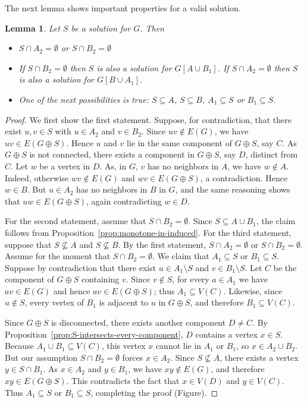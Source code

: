 \documentclass[11pt]{article}
\newtheorem{lemma}[theorem]{Lemma}
\theoremstyle{definition}
\begin{document}
The next lemma shows important properties for a valid solution.

\begin{lemma}\label{lemma:Sdisconnected-characterization}
Let $S$ be a solution for $G$.
Then
\begin{itemize}
    \item $S \cap A_2 = \emptyset$ or $S \cap B_2 = \emptyset$
    \item If $S \cap B_2 = \emptyset$ then $S$ is also a solution for $G[A\cup B_1]$. If $S \cap A_2  = \emptyset$ then $S$ is also a solution for $G[B\cup A_1]$.
  \item One of the next possibilities is true: $S \subseteq A$, $S \subseteq B$,
$A_1 \subseteq S $ or $B_1 \subseteq S$.
\end{itemize}
\end{lemma}
\begin{proof}
We first show the first statement.
 Suppose, for contradiction, that there exist $u,v\in S$ with 
$u\in A_2$ and $v\in B_2$.
Since $uv\notin E(G)$, we have $uv\in E(G \oplus S)$.
Hence $u$ and $v$ lie in the same component of $G\oplus S$, say $C$.
    As $G \oplus S$ is not connected, there exists a component in $G \oplus S$, say $D$, distinct from $C$.
    Let $w$ be a vertex in $D$.
    As, in $G$, $v$ has no neighbors in $A$, we have $w \notin A$. Indeed, otherwise $wv \notin E(G)$ and $wv  \in E(G \oplus S)$, a contradiction.
    Hence $w \in B$. But $u\in A_2$ has no neighbors in $B$ in $G$, and the same reasoning 
shows that $uw\in E(G\oplus S)$, again contradicting $w\in D$.


For the second statement, assume that $S \cap B_2 = \emptyset$.
Since $S \subseteq A \cup B_1$, 
the claim follows from Proposition~\ref{prop:monotone-in-induced}.
For the third statement, suppose that $S \not\subseteq A$ and $S \not\subseteq B$.
By the first statement, $S \cap A_2 = \emptyset$ or
$S \cap B_2 = \emptyset$.
Assume for the moment that $S \cap B_2 = \emptyset$.
We claim that $A_1 \subseteq S$ or $B_1 \subseteq S$.
Suppose by contradiction that there exist
$u \in A_1 \setminus S$ and $v \in B_1 \setminus S$.
Let $C$ be the component of $G \oplus S$ containing $v$.
Since $v \notin S$, for every $a \in A_1$ we have $av \in E(G)$ and hence
$av \in E(G \oplus S)$; thus $A_1 \subseteq V(C)$.
Likewise, since $u \notin S$, every vertex of $B_1$ is adjacent to $u$ in
$G\oplus S$, and therefore $B_1 \subseteq V(C)$.

Since $G \oplus S$ is disconnected, there exists another component $D \neq C$.
By Proposition~\ref{prop:S-intersects-every-component}, $D$ contains a vertex
$x \in S$.
Because $A_1 \cup B_1 \subseteq V(C)$, this vertex $x$ cannot lie in $A_1$ or
$B_1$, so $x \in A_2 \cup B_2$.
But our assumption $S \cap B_2 = \emptyset$ forces $x \in A_2$.
Since $S \not\subseteq A$, there exists a vertex $y \in S \cap B_1$.
As $x \in A_2$ and $y \in B_1$, we have $xy \notin E(G)$, and therefore
$xy \in E(G \oplus S)$.
This contradicts the fact that $x \in V(D)$ and $y \in V(C)$.
Thus $A_1 \subseteq S$ or $B_1 \subseteq S$, completing the proof (Figure).
\end{proof}
\end{document}
